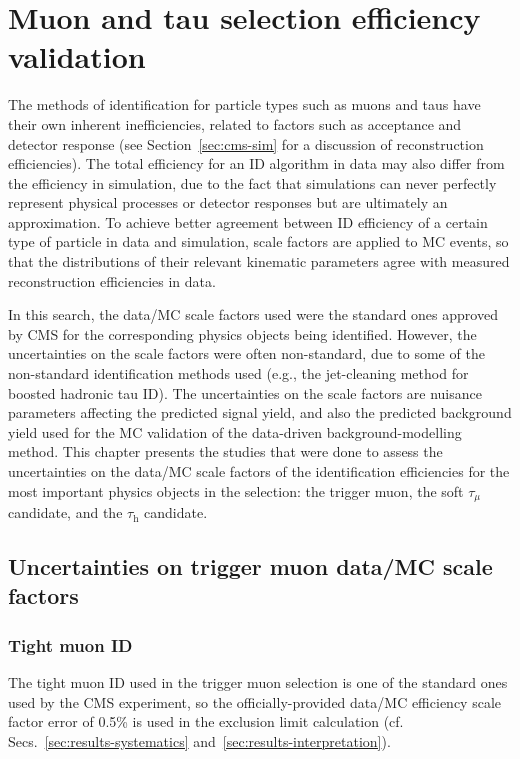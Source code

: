 \chapter{Muon and tau selection efficiency validation\label{sec:lepideff}}
\sloppy

The methods of identification for particle types such as muons and taus have their own inherent inefficiencies, related to factors such as acceptance and detector response (see Section~\ref{sec:cms-sim} for a discussion of reconstruction efficiencies). The total efficiency for an ID algorithm in data may also differ from the efficiency in simulation, due to the fact that simulations can never perfectly represent physical processes or detector responses but are ultimately an approximation. To achieve better agreement between ID efficiency of a certain type of particle in data and simulation, scale factors are applied to MC events, so that the distributions of their relevant kinematic parameters agree with measured reconstruction efficiencies in data.

In this search, the data/MC scale factors used were the standard ones approved by CMS for the corresponding physics objects being identified. However, the uncertainties on the scale factors were often non-standard, due to some of the non-standard identification methods used (e.g., the jet-cleaning method for boosted hadronic tau ID). The uncertainties on the scale factors are nuisance parameters affecting the predicted signal yield, and also the predicted background yield used for the MC validation of the data-driven background-modelling method. This chapter presents the studies that were done to assess the uncertainties on the data/MC scale factors of the identification efficiencies for the most important physics objects in the selection: the trigger muon, the soft $\tau_{\mu}$ candidate, and the $\tau_{\text{h}}$ candidate.

\section{Uncertainties on trigger muon data/MC scale factors\label{sec:lepideff-triggermu}}

\subsection{Tight muon ID\label{lepideff-tightID}}

The tight muon ID used in the trigger muon selection is one of the standard ones used by the CMS experiment, so the officially-provided data/MC efficiency scale factor error of 0.5\% is used in the exclusion limit calculation (cf. Secs.~\ref{sec:results-systematics} and~\ref{sec:results-interpretation}).


